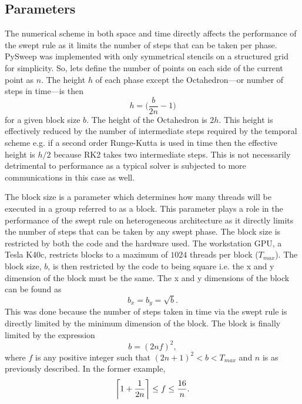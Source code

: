 \documentclass[review]{elsarticle}
\DeclarePairedDelimiter{\ceil}{\lceil}{\rceil}
\begin{document}
\subsection{Parameters}
\par
The numerical scheme in both space and time directly affects the performance of the swept rule as it limits the number of steps that can be taken per phase. PySweep was implemented with only symmetrical stencils on a structured grid for simplicity. So, lets define the number of points on each side of the current point as $n$. The height $h$ of each phase except the Octahedron---or number of steps in time---is then
\begin{equation}
    h = \bigg(\frac{b}{2n}-1\bigg)
\end{equation}
for a given block size $b$. The height of the Octahedron is $2h$. This height is effectively reduced by the number of intermediate steps required by the temporal scheme e.g. if a second order Runge-Kutta is used in time then the effective height is $h/2$ because RK2 takes two intermediate steps. This is not necessarily detrimental to performance as a typical solver is subjected to more communications in this case as well.

\par
The block size is a parameter which determines how many threads will be executed in a group referred to as a block. This parameter plays a role in the performance of the swept rule on heterogeneous architecture as it directly limits the number of steps that can be taken by any swept phase. The block size is restricted by both the code and the hardware used. The workstation GPU, a Tesla K40c, restricts blocks to a maximum of $1024$ threads per block ($T_{max}$).
The block size, $b$, is then restricted by the code to being square i.e. the x and y dimension of the block must be the same. The x and y dimensions of the block can be found as
\begin{equation}
    b_x = b_y = \sqrt{b}.
\end{equation}
This was done because the number of steps taken in time via the swept rule is directly limited by the minimum dimension of the block. The block is finally limited by the expression
\begin{equation}
    b  = (2nf)^2,
\end{equation}
where $f$ is any positive integer such that $(2n+1)^2 < b < T_{max}$ and $n$ is as previously described. In the former example,
\begin{equation}
  \ceil[\bigg]{1+\frac{1}{2n}} \leq f \leq \frac{16}{n}.
\end{equation}
\end{document}
